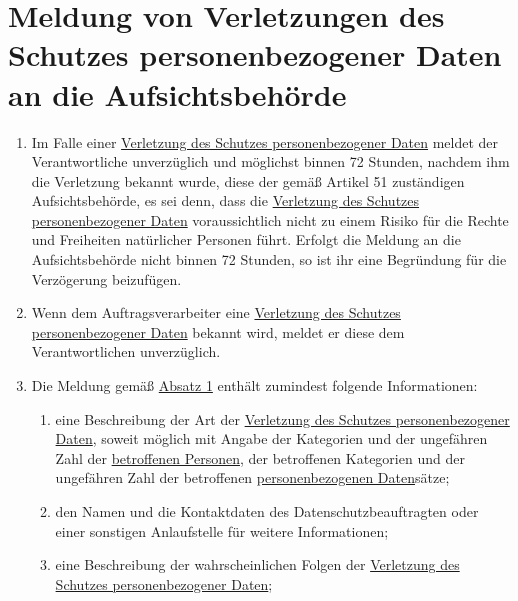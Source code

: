 \chapter{Meldung von Verletzungen des Schutzes personenbezogener Daten an die Aufsichtsbehörde}
\label{ch:33}


\begin{enumerate}

  \item Im Falle einer \hyperref[itm:04-12]{Verletzung des Schutzes personenbezogener Daten} meldet der Verantwortliche unverzüglich und
   möglichst binnen 72 Stunden, nachdem ihm die Verletzung bekannt wurde, diese der gemäß Artikel 51 zuständigen
   Aufsichtsbehörde, es sei denn, dass die \hyperref[itm:04-12]{Verletzung des Schutzes personenbezogener Daten} voraussichtlich nicht zu
   einem Risiko für die Rechte und Freiheiten natürlicher Personen führt. Erfolgt die Meldung an die Aufsichtsbehörde
   nicht binnen 72 Stunden, so ist ihr eine Begründung für die Verzögerung beizufügen.
  \label{itm:33-1}

  \item Wenn dem Auftragsverarbeiter eine \hyperref[itm:04-12]{Verletzung des Schutzes personenbezogener Daten} bekannt wird, meldet er diese
   dem Verantwortlichen unverzüglich.
  \label{itm:33-2}

  \item Die Meldung gemäß \hyperref[itm:33-1]{Absatz 1} enthält zumindest folgende Informationen:
  \label{itm:33-3}

  \begin{enumerate}
  
    \item eine Beschreibung der Art der \hyperref[itm:04-12]{Verletzung des Schutzes personenbezogener Daten}, soweit möglich mit Angabe der
     Kategorien und der ungefähren Zahl der \hyperref[itm:04-1]{betroffenen Personen}, der betroffenen Kategorien und der ungefähren Zahl
     der betroffenen \hyperref[itm:04-1]{personenbezogenen Daten}sätze;
    \label{itm:33-3a}

    \item den Namen und die Kontaktdaten des Datenschutzbeauftragten oder einer sonstigen Anlaufstelle für weitere
     Informationen;
    \label{itm:33-3b}

    \item eine Beschreibung der wahrscheinlichen Folgen der \hyperref[itm:04-12]{Verletzung des Schutzes personenbezogener Daten};
    \label{itm:33-3c}


\end{enumerate}
\end{enumerate}
